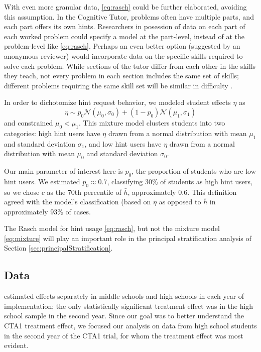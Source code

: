 \documentclass{article}\usepackage[]{graphicx}\usepackage[]{color}
\begin{document}
With even more granular data, \eqref{eq:rasch} could be further
elaborated, avoiding this assumption.
In the Cognitive Tutor, problems often have multiple parts, and each part offers its own hints.
Researchers in posession of data on each part of each worked problem could specify a model at the part-level, instead of at the problem-level like \eqref{eq:rasch}.
Perhaps an even better option (suggested by an anonymous reviewer) would incorporate data on the specific skills required to solve each problem.
While sections of the tutor differ from each other in the skills they teach, not every problem in each section includes the same set of skills; different problems requiring the same skill set will be similar in difficulty \citep[see, e.g.]{goldin2012learner,pavlik2009performance}.

In order to dichotomize hint request behavior, we modeled
student effects $\eta$ as
\begin{equation}\label{eq:mixture}
\eta\sim
p_0\mathcal{N}(\mu_0,\sigma_0)+(1-p_0)\mathcal{N}(\mu_1,\sigma_1)
\end{equation}
and constrained $\mu_0<\mu_1$.
This mixture model clusters students into two categories: high hint
users have $\eta$ drawn from a normal distribution with mean $\mu_1$
and standard deviation $\sigma_1$, and low hint users have $\eta$
drawn from a normal distribution with mean $\mu_0$ and standard
deviation $\sigma_0$.


Our main parameter of interest here is $p_0$, the proportion of
students who are low hint users.
We estimated $p_0\approx$0.7,
classifying 30\% of students as
high hint users, so we chose $c$ as the
70th percentile of $\bar{h}$,
approximately 0.6.
This definition agreed with the model's classification (based on
$\eta$ as opposed to $\bar{h}$ in
approximately 93\% of cases.

The Rasch model for hint usage \eqref{eq:rasch}, but not the mixture
model \eqref{eq:mixture} will play an important role in the principal
stratification analysis of Section \ref{sec:principalStratification}.



\subsection{Data}\label{sec:data}

\citep{pane2014effectiveness} estimated effects separately in middle
schools and high schools in each year of implementation; the
only statistically significant treatment effect was in the high school
sample in the second year.
Since our goal was to better understand the CTA1
treatment effect, we focused our analysis on data from high school students in
the second year of the CTA1 trial, for whom the treatment effect was
most evident.
\end{document}
